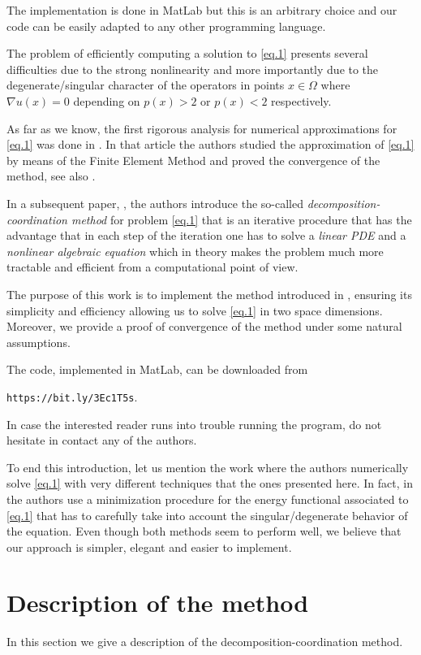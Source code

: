\documentclass[11pt]{amsart}
\theoremstyle{remark}
\theoremstyle{definition}
\numberwithin{equation}{section}
\begin{document}
The implementation is done in {\sc MatLab} but this is an arbitrary choice and our code can be easily adapted to any other programming language.


The problem of efficiently computing a solution to \eqref{eq.1} presents several difficulties due to the strong nonlinearity and more importantly due to the degenerate/singular character of the operators in points $x\in\Omega$ where $\nabla u(x)=0$ depending on $p(x)>2$ or $p(x)<2$ respectively.

As far as we know, the first rigorous analysis for numerical approximations for \eqref{eq.1} was done in \cite{DPLM}. In that article the authors studied the approximation of \eqref{eq.1} by means of the Finite Element Method and proved the convergence of the method, see also \cite{D, DPM2}.

In a subsequent paper, \cite{DPM}, the authors introduce the so-called {\em decomposition-coordination method} for problem \eqref{eq.1} that is an iterative procedure that has the advantage that in each step of the iteration one has to solve a {\em linear PDE} and a {\em nonlinear algebraic equation} which in theory makes the problem much more tractable and efficient from a computational point of view. 

The purpose of this work is to implement the method introduced in \cite{DPM}, ensuring its simplicity and efficiency allowing us to solve \eqref{eq.1} in two space dimensions. Moreover, we provide a proof of convergence of the method under some natural assumptions.

The code, implemented in {\sc MatLab}, can be downloaded from 
\begin{center}
{\tt https://bit.ly/3Ec1T5s}. 
\end{center}
In case the interested reader runs into trouble running the program, do not hesitate in contact any of the authors.


To end this introduction, let us mention the work \cite{CZ} where the authors numerically solve \eqref{eq.1} with very different techniques that the ones presented here. In fact, in \cite{CZ} the authors use a minimization procedure for the energy functional associated to \eqref{eq.1} that has to carefully take into account the singular/degenerate behavior of the equation. Even though both methods seem to perform well, we believe that our approach is simpler, elegant and easier to implement.


\section{Description of the method}\label{algoritmo}
In this section we give a description of the decomposition-coordination method.
\end{document}
